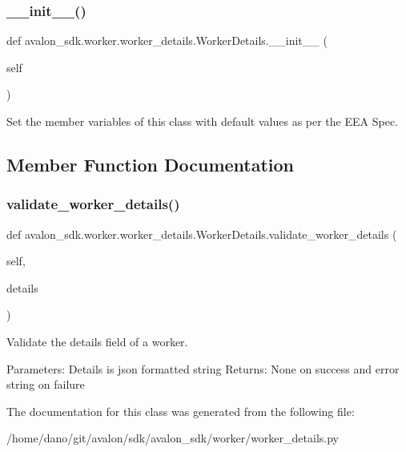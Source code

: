 \subsubsection{\texorpdfstring{\+\_\+\+\_\+init\+\_\+\+\_\+()}{\_\_init\_\_()}}
{\footnotesize\ttfamily def avalon\+\_\+sdk.\+worker.\+worker\+\_\+details.\+Worker\+Details.\+\_\+\+\_\+init\+\_\+\+\_\+ (\begin{DoxyParamCaption}\item[{}]{self }\end{DoxyParamCaption})}

\begin{DoxyVerb}Set the member variables of this class with default
values as per the EEA Spec.
\end{DoxyVerb}
 

\subsection{Member Function Documentation}
\mbox{\label{classavalon__sdk_1_1worker_1_1worker__details_1_1WorkerDetails_a7c4914b92c2fcdcac1e448cb42a76a82}} 
\subsubsection{\texorpdfstring{validate\+\_\+worker\+\_\+details()}{validate\_worker\_details()}}
{\footnotesize\ttfamily def avalon\+\_\+sdk.\+worker.\+worker\+\_\+details.\+Worker\+Details.\+validate\+\_\+worker\+\_\+details (\begin{DoxyParamCaption}\item[{}]{self,  }\item[{}]{details }\end{DoxyParamCaption})}

\begin{DoxyVerb}Validate the details field of a worker.

Parameters:
    Details is json formatted string
Returns:
    None on success and error string on failure
\end{DoxyVerb}
 

The documentation for this class was generated from the following file\+:\begin{DoxyCompactItemize}
\item 
/home/dano/git/avalon/sdk/avalon\+\_\+sdk/worker/worker\+\_\+details.\+py\end{DoxyCompactItemize}
